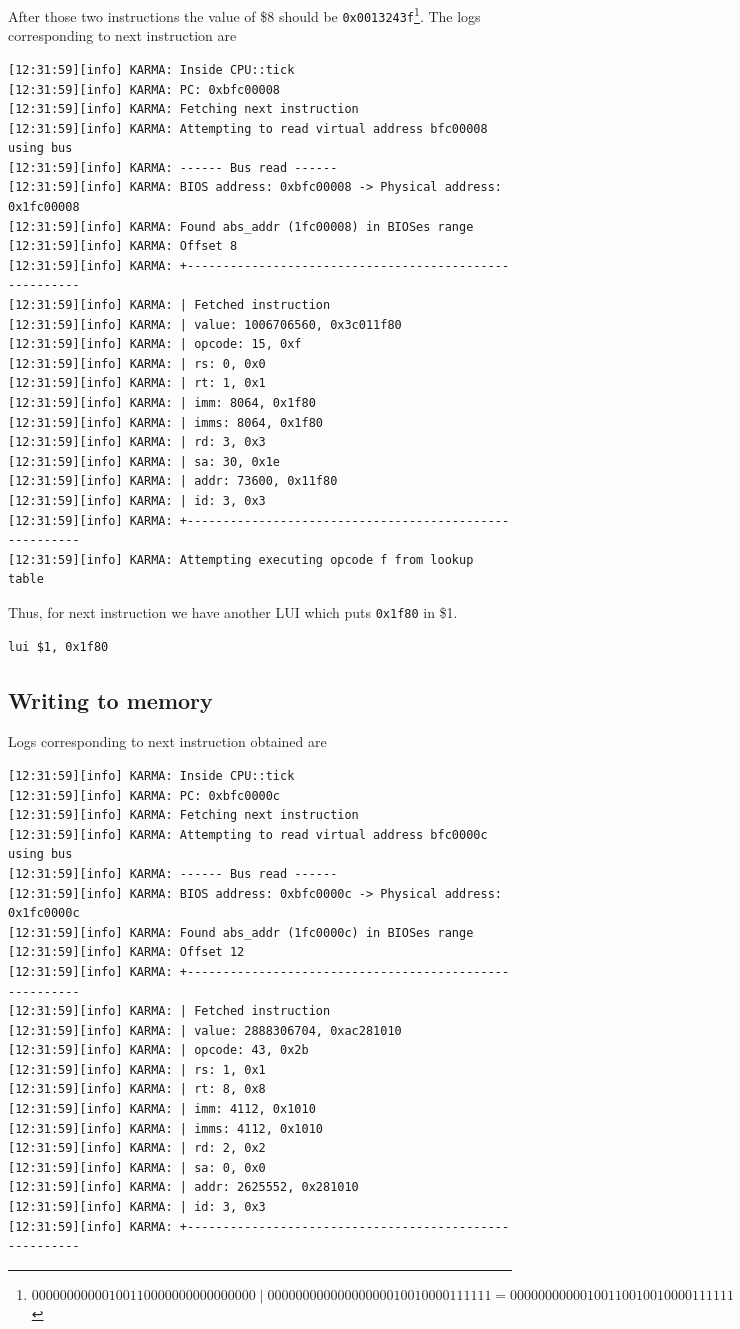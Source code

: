 \documentclass[a4paper]{article}
\newcommand{\code}[1] {\texttt{#1}}
\begin{document}
After those two instructions the value of \$8 should be
\code{0x0013243f}\footnote{$00000000000100110000000000000000 \mid 00000000000000000010010000111111 = 00000000000100110010010000111111$}. The logs corresponding to next instruction are

\begin{verbatim}
[12:31:59][info] KARMA: Inside CPU::tick
[12:31:59][info] KARMA: PC: 0xbfc00008
[12:31:59][info] KARMA: Fetching next instruction
[12:31:59][info] KARMA: Attempting to read virtual address bfc00008 using bus
[12:31:59][info] KARMA: ------ Bus read ------
[12:31:59][info] KARMA: BIOS address: 0xbfc00008 -> Physical address: 0x1fc00008
[12:31:59][info] KARMA: Found abs_addr (1fc00008) in BIOSes range
[12:31:59][info] KARMA: Offset 8
[12:31:59][info] KARMA: +-------------------------------------------------------
[12:31:59][info] KARMA: | Fetched instruction 
[12:31:59][info] KARMA: | value: 1006706560, 0x3c011f80
[12:31:59][info] KARMA: | opcode: 15, 0xf
[12:31:59][info] KARMA: | rs: 0, 0x0
[12:31:59][info] KARMA: | rt: 1, 0x1
[12:31:59][info] KARMA: | imm: 8064, 0x1f80
[12:31:59][info] KARMA: | imms: 8064, 0x1f80
[12:31:59][info] KARMA: | rd: 3, 0x3
[12:31:59][info] KARMA: | sa: 30, 0x1e
[12:31:59][info] KARMA: | addr: 73600, 0x11f80
[12:31:59][info] KARMA: | id: 3, 0x3
[12:31:59][info] KARMA: +-------------------------------------------------------
[12:31:59][info] KARMA: Attempting executing opcode f from lookup table
\end{verbatim}

Thus, for next instruction we have another LUI which puts \code{0x1f80} in \$1.

\begin{lstlisting}[language=assembly]
lui $1, 0x1f80
\end{lstlisting}

\subsection{Writing to memory}
Logs corresponding to next instruction obtained are
\begin{verbatim}
[12:31:59][info] KARMA: Inside CPU::tick
[12:31:59][info] KARMA: PC: 0xbfc0000c
[12:31:59][info] KARMA: Fetching next instruction
[12:31:59][info] KARMA: Attempting to read virtual address bfc0000c using bus
[12:31:59][info] KARMA: ------ Bus read ------
[12:31:59][info] KARMA: BIOS address: 0xbfc0000c -> Physical address: 0x1fc0000c
[12:31:59][info] KARMA: Found abs_addr (1fc0000c) in BIOSes range
[12:31:59][info] KARMA: Offset 12
[12:31:59][info] KARMA: +-------------------------------------------------------
[12:31:59][info] KARMA: | Fetched instruction 
[12:31:59][info] KARMA: | value: 2888306704, 0xac281010
[12:31:59][info] KARMA: | opcode: 43, 0x2b
[12:31:59][info] KARMA: | rs: 1, 0x1
[12:31:59][info] KARMA: | rt: 8, 0x8
[12:31:59][info] KARMA: | imm: 4112, 0x1010
[12:31:59][info] KARMA: | imms: 4112, 0x1010
[12:31:59][info] KARMA: | rd: 2, 0x2
[12:31:59][info] KARMA: | sa: 0, 0x0
[12:31:59][info] KARMA: | addr: 2625552, 0x281010
[12:31:59][info] KARMA: | id: 3, 0x3
[12:31:59][info] KARMA: +-------------------------------------------------------
\end{verbatim}
\end{document}
